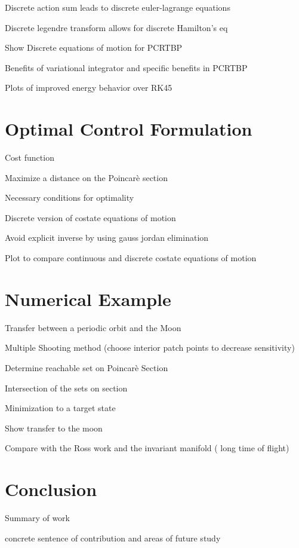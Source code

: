 \documentclass[letterpaper, preprint, paper,11pt]{AAS}	%
\begin{document}
Discrete action sum leads to discrete euler-lagrange equations

Discrete legendre transform allows for discrete Hamilton's eq

Show Discrete equations of motion for PCRTBP

Benefits of variational integrator and specific benefits in PCRTBP

Plots of improved energy behavior over RK45

\section{Optimal Control Formulation}\label{sec:optimal_control}
Cost function

Maximize a distance on the Poincar\`e section

Necessary conditions for optimality

Discrete version of costate equations of motion

Avoid explicit inverse by using gauss jordan elimination

Plot to compare continuous and discrete costate equations of motion

\section{Numerical Example}\label{sec:simulation}
Transfer between a periodic orbit and the Moon

Multiple Shooting method (choose interior patch points to decrease sensitivity)

Determine reachable set on Poincar\`e Section

Intersection of the sets on section

Minimization to a target state

Show transfer to the moon

Compare with the Ross work and the invariant manifold ( long time of flight)
\section{Conclusion}\label{sec:conclusion}

Summary of work

concrete sentence of contribution and areas of future study


\end{document}
